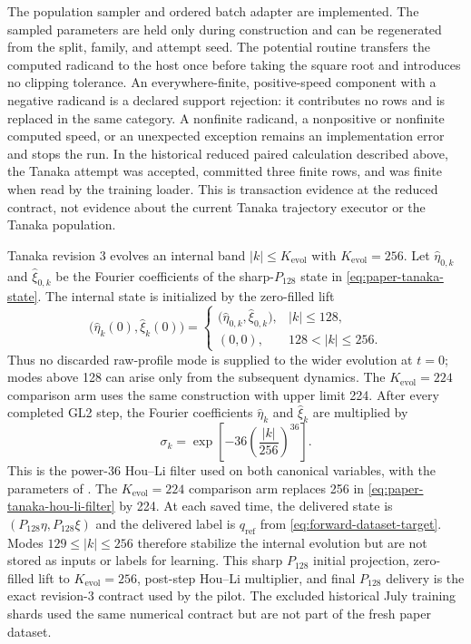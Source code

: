 The population sampler and ordered batch adapter are implemented.  The
sampled parameters are held only during construction and can be regenerated
from the split, family, and attempt seed.  The potential routine
transfers the computed radicand to the host once before taking the square root
and introduces no clipping tolerance.  An everywhere-finite, positive-speed
component with a negative radicand is a declared support rejection: it
contributes no rows and is replaced in the same category.  A nonfinite radicand,
a nonpositive or nonfinite computed speed, or an unexpected exception remains
an implementation error and stops the run.
In the historical reduced paired calculation described above, the Tanaka
attempt was accepted, committed three finite rows, and was finite when read by
the training loader.  This is transaction evidence at the reduced contract,
not evidence about the current Tanaka trajectory executor or the Tanaka
population.

Tanaka revision 3 evolves an internal band
$|k|\leq K_{\mathrm{evol}}$ with $K_{\mathrm{evol}}=256$.  Let
$\widehat\eta_{0,k}$ and $\widehat\xi_{0,k}$ be the Fourier coefficients of
the sharp-$P_{128}$ state in \cref{eq:paper-tanaka-state}.  The internal state
is initialized by the zero-filled lift
\begin{equation}
  \bigl(\widehat\eta_k(0),\widehat\xi_k(0)\bigr)
  =
  \begin{cases}
    \bigl(\widehat\eta_{0,k},\widehat\xi_{0,k}\bigr),&|k|\leq128,\\
    (0,0),&128<|k|\leq256.
  \end{cases}
  \label{eq:paper-tanaka-zero-filled-lift}
\end{equation}
Thus no discarded raw-profile mode is supplied to the wider evolution at
$t=0$; modes above 128 can arise only from the subsequent dynamics.  The
$K_{\mathrm{evol}}=224$ comparison arm uses the same construction with upper
limit 224.  After every completed GL2 step, the Fourier coefficients
$\widehat\eta_k$ and $\widehat\xi_k$ are multiplied by
\begin{equation}
  \sigma_k
  =\exp\!\left[-36\left(\frac{|k|}{256}\right)^{36}\right].
  \label{eq:paper-tanaka-hou-li-filter}
\end{equation}
This is the power-36 Hou--Li filter \cite{hou2007} used on both canonical
variables, with the parameters of \cite[Eq.~(29)]{xu2009}.  The
$K_{\mathrm{evol}}=224$ comparison arm replaces 256 in
\cref{eq:paper-tanaka-hou-li-filter} by 224.  At each saved time, the delivered
state is
$(P_{128}\eta,P_{128}\xi)$ and the delivered label is
$q_{\mathrm{ref}}$ from \cref{eq:forward-dataset-target}.  Modes
$129\leq|k|\leq256$ therefore stabilize the internal evolution but are not
stored as inputs or labels for learning.
This sharp \(P_{128}\) initial projection, zero-filled lift to
\(K_{\mathrm{evol}}=256\), post-step Hou--Li multiplier, and final
\(P_{128}\) delivery is the exact revision-3 contract used by the pilot.  The
excluded historical July training shards used the same numerical contract but
are not part of the fresh paper dataset.

